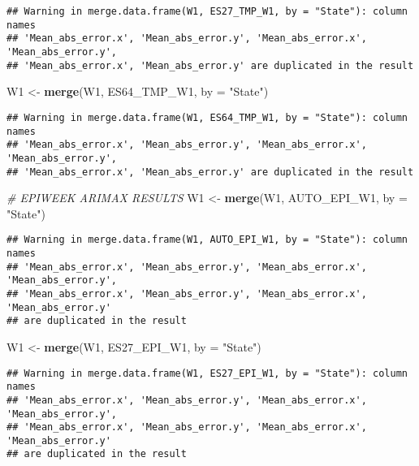 \documentclass[
]{article}
\newenvironment{Shaded}{\begin{snugshade}}{\end{snugshade}}
\newcommand{\AttributeTok}[1]{\textcolor[rgb]{0.13,0.29,0.53}{#1}}
\newcommand{\CommentTok}[1]{\textcolor[rgb]{0.56,0.35,0.01}{\textit{#1}}}
\newcommand{\FunctionTok}[1]{\textcolor[rgb]{0.13,0.29,0.53}{\textbf{#1}}}
\newcommand{\NormalTok}[1]{#1}
\newcommand{\OtherTok}[1]{\textcolor[rgb]{0.56,0.35,0.01}{#1}}
\newcommand{\StringTok}[1]{\textcolor[rgb]{0.31,0.60,0.02}{#1}}
\begin{document}
\begin{verbatim}
## Warning in merge.data.frame(W1, ES27_TMP_W1, by = "State"): column names
## 'Mean_abs_error.x', 'Mean_abs_error.y', 'Mean_abs_error.x', 'Mean_abs_error.y',
## 'Mean_abs_error.x', 'Mean_abs_error.y' are duplicated in the result
\end{verbatim}

\begin{Shaded}
\begin{Highlighting}[]
\NormalTok{W1 }\OtherTok{\textless{}{-}} \FunctionTok{merge}\NormalTok{(W1, ES64\_TMP\_W1, }\AttributeTok{by =} \StringTok{"State"}\NormalTok{)}
\end{Highlighting}
\end{Shaded}

\begin{verbatim}
## Warning in merge.data.frame(W1, ES64_TMP_W1, by = "State"): column names
## 'Mean_abs_error.x', 'Mean_abs_error.y', 'Mean_abs_error.x', 'Mean_abs_error.y',
## 'Mean_abs_error.x', 'Mean_abs_error.y' are duplicated in the result
\end{verbatim}

\begin{Shaded}
\begin{Highlighting}[]
\CommentTok{\# EPIWEEK ARIMAX RESULTS}
\NormalTok{W1 }\OtherTok{\textless{}{-}} \FunctionTok{merge}\NormalTok{(W1, AUTO\_EPI\_W1, }\AttributeTok{by =} \StringTok{"State"}\NormalTok{)}
\end{Highlighting}
\end{Shaded}

\begin{verbatim}
## Warning in merge.data.frame(W1, AUTO_EPI_W1, by = "State"): column names
## 'Mean_abs_error.x', 'Mean_abs_error.y', 'Mean_abs_error.x', 'Mean_abs_error.y',
## 'Mean_abs_error.x', 'Mean_abs_error.y', 'Mean_abs_error.x', 'Mean_abs_error.y'
## are duplicated in the result
\end{verbatim}

\begin{Shaded}
\begin{Highlighting}[]
\NormalTok{W1 }\OtherTok{\textless{}{-}} \FunctionTok{merge}\NormalTok{(W1, ES27\_EPI\_W1, }\AttributeTok{by =} \StringTok{"State"}\NormalTok{)}
\end{Highlighting}
\end{Shaded}

\begin{verbatim}
## Warning in merge.data.frame(W1, ES27_EPI_W1, by = "State"): column names
## 'Mean_abs_error.x', 'Mean_abs_error.y', 'Mean_abs_error.x', 'Mean_abs_error.y',
## 'Mean_abs_error.x', 'Mean_abs_error.y', 'Mean_abs_error.x', 'Mean_abs_error.y'
## are duplicated in the result
\end{verbatim}
\end{document}
